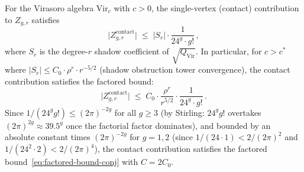 \begin{proposition}
\label{prop:contact-contribution-bound}
For the Virasoro algebra $\mathrm{Vir}_c$ with $c > 0$, the
single-vertex (contact) contribution to $Z_{g,r}$ satisfies
\begin{equation}\label{eq:contact-bound}
\bigl|Z_{g,r}^{\mathrm{contact}}\bigr|
\;\leq\;
|S_r| \cdot \frac{1}{24^g \cdot g!}\,,
\end{equation}
where $S_r$ is the degree-$r$ shadow coefficient of $\sqrt{Q_{\mathrm{Vir}}}$.
In particular, for $c > c^*$ where $|S_r| \leq C_0 \cdot \rho^r \cdot r^{-5/2}$
\textup{(}shadow obstruction tower convergence\textup{)}, the contact contribution
satisfies the factored bound:
\[
\bigl|Z_{g,r}^{\mathrm{contact}}\bigr|
\;\leq\;
C_0 \cdot \frac{\rho^r}{r^{5/2}} \cdot \frac{1}{24^g \cdot g!}\,.
\]
Since $1/(24^g g!) \leq (2\pi)^{-2g}$ for all $g \geq 3$
\textup{(}by Stirling: $24^g g!$ overtakes $(2\pi)^{2g} \approx 39.5^g$
once the factorial factor dominates\textup{)}, and bounded by an
absolute constant times $(2\pi)^{-2g}$ for $g = 1, 2$
\textup{(}since $1/(24 \cdot 1) < 2/(2\pi)^2$ and
$1/(24^2 \cdot 2) < 2/(2\pi)^4$\textup{)},
the contact contribution satisfies the factored
bound~\eqref{eq:factored-bound-conj} with $C = 2C_0$.
\end{proposition}

